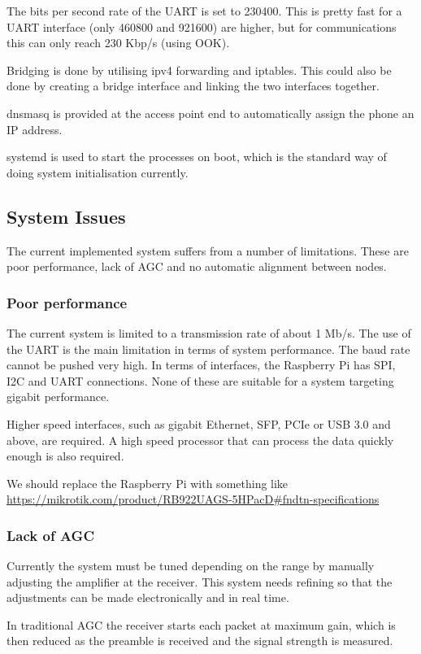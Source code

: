 The bits per second rate of the \ac{UART} is set to 230400. This is pretty fast
for a \ac{UART} interface (only 460800 and 921600) are higher, but for
communications this can only reach 230 Kbp/s (using \ac{OOK}).

Bridging is done by utilising ipv4 forwarding and iptables. This could also
be done by creating a bridge interface and linking the two interfaces together.

dnsmasq is provided at the access point end to automatically assign the phone
an IP address.

systemd is used to start the processes on boot, which is the standard way
of doing system initialisation currently.

\subsection{System Issues}
The current implemented system suffers from a number of limitations. These are
poor performance, lack of \ac{AGC} and no automatic alignment between nodes.

\subsubsection{Poor performance}
The current system is limited to a transmission rate of about 1 Mb/s. The use
of the \ac{UART} is the main limitation in terms of system performance. The baud
rate cannot be pushed very high. In terms of interfaces, the Raspberry Pi has
\ac{SPI}, \ac{I2C} and \ac{UART} connections. None of these are suitable for
a system targeting gigabit performance.

Higher speed interfaces, such as gigabit Ethernet, \ac{SFP}, \ac{PCIe} or
\ac{USB} 3.0 and above, are required. A high speed processor that can process
the data quickly enough is also required.

We should replace the Raspberry Pi with something like
\url{https://mikrotik.com/product/RB922UAGS-5HPacD#fndtn-specifications}

\subsubsection{Lack of \ac{AGC}}
Currently the system must be tuned depending on the range by manually
adjusting the amplifier at the receiver. This system needs refining so that
the adjustments can be made electronically and in real time.

In traditional \ac{AGC} the receiver starts each packet at maximum gain,
which is then reduced as the preamble is received and the signal strength
is measured.

